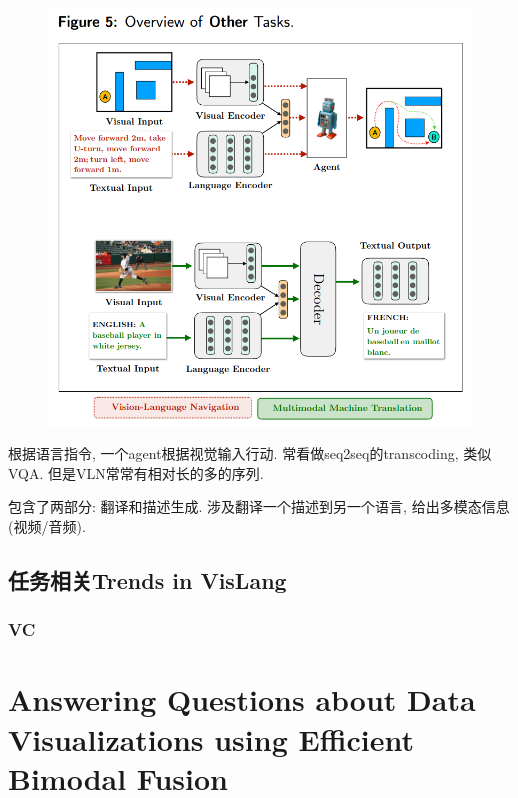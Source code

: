 \documentclass{article}
\begin{document}
\begin{figure}[htbp]
    \centering
    \includegraphics[width=\textwidth]{vl-other.png}
\end{figure}

根据语言指令, 一个agent根据视觉输入行动. 常看做seq2seq的transcoding, 类似VQA. 但是VLN常常有相对长的多的序列.


包含了两部分: 翻译和描述生成. 涉及翻译一个描述到另一个语言, 给出多模态信息(视频/音频).

\subsection{任务相关Trends in VisLang}

\subsubsection{VC}


\section{Answering Questions about Data Visualizations using Efficient Bimodal Fusion}
\end{document}
